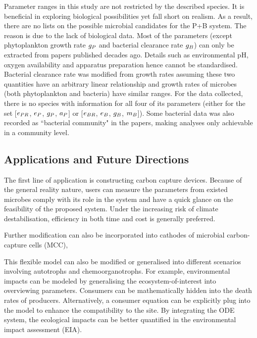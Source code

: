 \documentclass[../thesis.tex]{subfiles} %
\begin{document}
Parameter ranges in this study are not restricted by the described species.  It is beneficial in exploring biological possibilities yet fall short on realism.  As a result, there are no lists on the possible microbial candidates for the P+B system.  The reason is due to the lack of biological data.  Most of the parameters (except phytoplankton growth rate $g_P$ and bacterial clearance rate $g_B$) can only be extracted from papers published decades ago.  Details such as environmental pH, oxygen availability and apparatus preparation hence cannot be standardised.  Bacterial clearance rate was modified from growth rates assuming these two quantities have an arbitrary linear relationship and growth rates of microbes (both phytoplankton and bacteria) have similar ranges.  For the data collected, there is no species with information for all four of its parameters (either for the set [$e_{PR}$, $e_P$, $g_P$, $a_P$] or [$e_{BR}$, $e_B$, $g_B$, $m_B$]).  Some bacterial data was also recorded as ``bacterial community" in the papers,\autocite{cochran1988estimation} making analyses only achievable in a community level.

\subsection{Applications and Future Directions}
The first line of application is constructing carbon capture devices.  Because of the general reality nature, users can measure the parameters from existed microbes comply with its role in the system and have a quick glance on the feasibility of the proposed system.  Under the increasing risk of climate destabilisation,\autocite{notz2016observed,schuur2015climate} efficiency in both time and cost is generally preferred.

Further modification can also be incorporated into cathodes of microbial carbon-capture cells (MCC), \autocite{varanasi2020improvement,mohamed2020bioelectricity,neethu2018enhancement,pandit2012microbial}

This flexible model can also be modified or generalised into different scenarios involving autotrophs and chemoorganotrophs.  For example, environmental impacts can be modeled by generalising the ecosystem-of-interest into overviewing parameters.  Consumers can be mathematically hidden into the death rates of producers.  Alternatively, a consumer equation can be explicitly plug into the model to enhance the compatibility to the site.  By integrating the ODE system, the ecological impacts can be better quantified in the environmental impact assessment (EIA).
\end{document}
